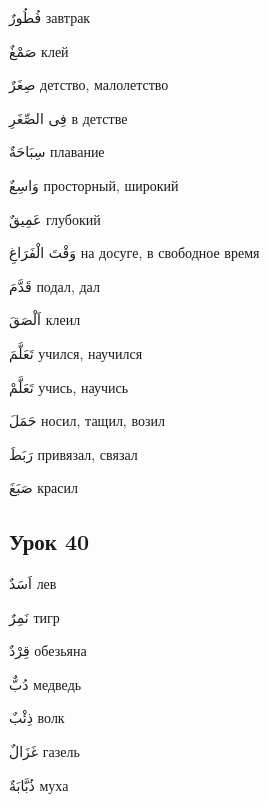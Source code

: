 \documentclass[a5paper]{article}
\newcommand\textstyleDropCaps[1]{#1}
\newcommand\textstyleCaptioncharacters[1]{#1}
\begin{document}
\textstyleCaptioncharacters{فُطُورٌ }\textstyleDropCaps{завтрак‎}

\textstyleCaptioncharacters{صَمْغٌ }\textstyleDropCaps{клей‎}

\textstyleCaptioncharacters{صِغَرٌ }\textstyleDropCaps{детство, малолетство‎}

\textstyleCaptioncharacters{فِى الصِّغَرِ }\textstyleDropCaps{в детстве‎}

\textstyleCaptioncharacters{سِبَاحَةٌ }\textstyleDropCaps{плавание‎}

\textstyleCaptioncharacters{وَاسِعٌ }\textstyleDropCaps{просторный, широ­кий‎}

\textstyleCaptioncharacters{عَمِيقٌ }\textstyleDropCaps{глубокий‎}

\textstyleCaptioncharacters{وَقْتَ الْفَرَاغِ }\textstyleDropCaps{на досуге, в свободное время‎}

\textstyleCaptioncharacters{قَدَّمَ }\textstyleDropCaps{подал, дал‎}

\textstyleCaptioncharacters{اَلْصَقَ }\textstyleDropCaps{клеил‎}

\textstyleCaptioncharacters{تَعَلَّمَ }\textstyleDropCaps{учился, научился‎}

\textstyleCaptioncharacters{تَعَلَّمْ }\textstyleDropCaps{учись, научись‎}

\textstyleCaptioncharacters{حَمَلَ }\textstyleDropCaps{носил, тащил, возил‎}

\textstyleCaptioncharacters{رَبَطَ }\textstyleDropCaps{привязал, связал‎}

\textstyleCaptioncharacters{صَبَغَ }\textstyleDropCaps{красил‎}

\subsection[Урок 40‎]{\textstyleDropCaps{Урок 40‎}}
\textstyleCaptioncharacters{اَسَدٌ }\textstyleDropCaps{лев‎}

\textstyleCaptioncharacters{نَمِرٌ }\textstyleDropCaps{тигр‎}

\textstyleCaptioncharacters{قِرْدٌ }\textstyleDropCaps{обезьяна‎}

\textstyleCaptioncharacters{دُبٌّ }\textstyleDropCaps{медведь‎}

\textstyleCaptioncharacters{ذِئْبٌ }\textstyleDropCaps{волк‎}

\textstyleCaptioncharacters{غَزَالٌ }\textstyleDropCaps{газель‎}

\textstyleCaptioncharacters{ذُبَّابَةٌ }\textstyleDropCaps{муха‎}
\end{document}
